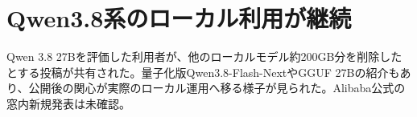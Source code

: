 \section{Qwen3.8系のローカル利用が継続}
Qwen 3.8 27Bを評価した利用者が、他のローカルモデル約200GB分を削除したとする投稿が共有された。量子化版Qwen3.8-Flash-NextやGGUF 27Bの紹介もあり、公開後の関心が実際のローカル運用へ移る様子が見られた。Alibaba公式の窓内新規発表は未確認。
